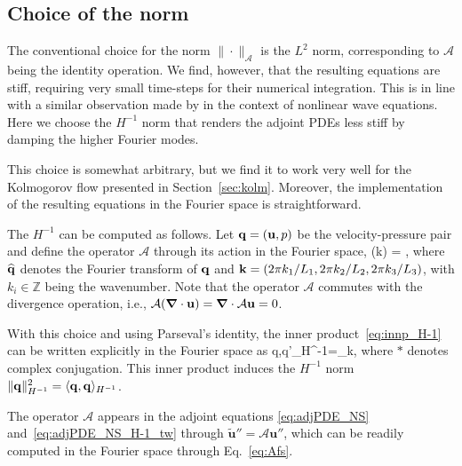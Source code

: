 \documentclass{jfm}
\begin{document}
\subsection{Choice of the norm}\label{sec:H-1}
The conventional choice for the norm $\|\cdot\|_{\mathcal A}$ is the $L^2$ norm, corresponding
to $\mathcal A$ being the identity operation. We find,
however, that the resulting equations are stiff, requiring very small
time-steps for their numerical integration. This is in line with a similar observation
made by in the context of nonlinear wave equations.
Here we choose the $H^{-1}$ norm that renders the
adjoint PDEs less stiff by damping the higher Fourier modes.

This choice is somewhat
arbitrary, but we find it to work very well for the Kolmogorov flow presented in
Section~\ref{sec:kolm}. Moreover, the implementation of the resulting equations
in the Fourier space is straightforward.

The $H^{-1}$ can be computed as follows. Let $\mathbf q=(\mathbf u,p)$ be the
velocity-pressure pair and define
the operator $\mathcal A$ through its action in
the Fourier space,
\beq
{}(\vc k) = ,
\label{eq:Afs}
\eeq
where $\widehat{\mathbf q}$ denotes the Fourier transform of $\mathbf q$ and $\mathbf
k=(2\pi k_1/L_1,2\pi k_2/L_2,2\pi k_3/L_3)$, with $k_i\in\mathbb Z$ being the
wavenumber.
Note that the operator $\mathcal A$ commutes with the
divergence operation, i.e., $\mathcal A (\mbox{\boldmath $\nabla$}\cdot \mathbf u)=\mbox{\boldmath $\nabla$}\cdot\mathcal A\mathbf u=0$.

With this choice and using Parseval's identity,
the inner product~\eqref{eq:innp_H-1} can be written explicitly in the Fourier space as
\beq
\langle \vc q,\vc q'\rangle_{H^{-1}}=\sum_{\vc k},
\label{bogusTime}
\eeq
where $\ast$ denotes complex conjugation. This inner product induces the $H^{-1}$ norm
$\|\mathbf q\|_{H^{-1}}^2=\langle \mathbf q,\mathbf q\rangle_{H^{-1}}$.

The operator $\mathcal A$ appears in the adjoint equations
\eqref{eq:adjPDE_NS} and~\eqref{eq:adjPDE_NS_H-1_tw} through
$\tilde{\mathbf u}''=\mathcal A\mathbf u''$,
which can be readily computed in the Fourier space through
Eq.~\eqref{eq:Afs}.

%
%
\end{document}
